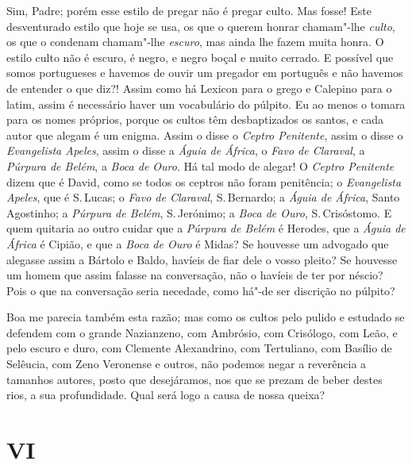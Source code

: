 Sim, Padre; porém esse estilo de pregar não é pregar culto. Mas fosse!
Este desventurado estilo que hoje se usa, os que o querem honrar
chamam"-lhe \emph{culto}, os que o condenam chamam"-lhe \emph{escuro},
mas ainda lhe fazem muita honra. O estilo culto não é escuro, é negro, e
negro boçal e muito cerrado. E possível que somos portugueses e
havemos de ouvir um pregador em português e não havemos de entender o
que diz?! Assim como há Lexicon para o grego e Calepino para o latim,
assim é necessário haver um vocabulário do púlpito. Eu ao menos o tomara
para os nomes próprios, porque os cultos têm desbaptizados os santos,
e cada autor que alegam é um enigma. Assim o disse o \emph{Ceptro
Penitente}, assim o disse o \emph{Evangelista Apeles}, assim o disse a
\emph{Águia de África}, o \emph{Favo de Claraval}, a \emph{Púrpura de
Belém}, a \emph{Boca de Ouro}. Há tal modo de alegar! O \emph{Ceptro
Penitente} dizem que é David, como se todos os ceptros não foram
penitência; o \emph{Evangelista Apeles}, que é S.\,Lucas; o \emph{Favo de
Claraval}, S.\,Bernardo; a \emph{Águia de África}, Santo Agostinho; a
\emph{Púrpura de Belém}, S.\,Jerónimo; a \emph{Boca de Ouro}, S.\,Crisóstomo. E quem quitaria ao outro cuidar que a \emph{Púrpura de
Belém} é Herodes, que a \emph{Águia de África} é Cipião, e que a
\emph{Boca de Ouro} é Midas? Se houvesse um advogado que alegasse assim
a Bártolo e Baldo, havíeis de fiar dele o vosso pleito? Se houvesse um
homem que assim falasse na conversação, não o havíeis de ter por
néscio? Pois o que na conversação seria necedade, como há"-de ser
discrição no púlpito?

Boa me parecia também esta razão; mas como os cultos pelo
pulido e estudado se defendem com o grande Nazianzeno, com Ambrósio, com
Crisólogo, com Leão, e pelo escuro e duro, com Clemente Alexandrino, com
Tertuliano, com Basílio de Selêucia, com Zeno Veronense e outros, não
podemos negar a reverência a
tamanhos autores, posto que desejáramos, nos que se prezam de beber
destes rios, a sua profundidade. Qual será logo a causa de nossa queixa?

\section{VI}

